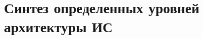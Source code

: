 \documentclass{article}
\begin{document}
\section{Синтез определенных уровней архитектуры ИС}


\end{document}
